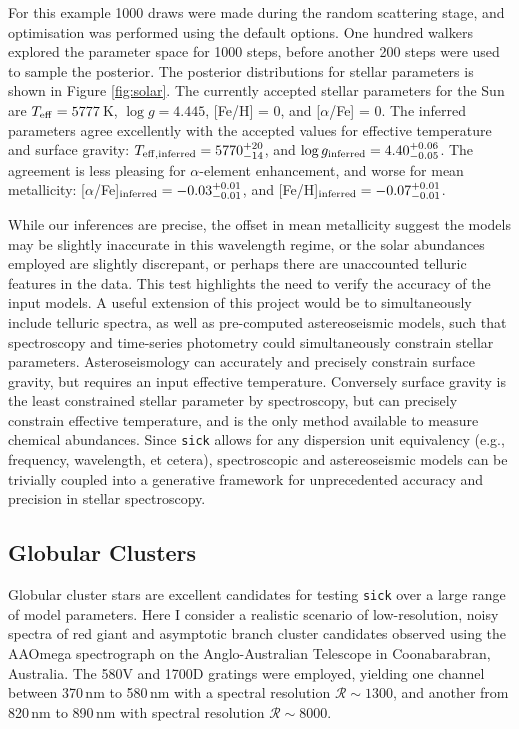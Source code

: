 \documentclass[iop]{emulateapj}
\newcommand{\sick}{\texttt{sick}}
\begin{document}
For this example 1000 draws were made during the random scattering stage, and 
optimisation was performed using the default options. One hundred walkers 
explored the parameter space for 1000 steps, before another 200 steps were used 
to sample the posterior. The posterior distributions for stellar parameters is 
shown in Figure \ref{fig:solar}. The currently accepted stellar parameters for 
the Sun are $T_{\rm eff} = 5777$\,K, $\log{g} = 4.445$, [Fe/H] = 0, and 
[$\alpha$/Fe] = 0. The inferred parameters agree excellently with the accepted 
values for effective temperature and surface gravity: 
$T_{{\rm eff},{\rm inferred}} = 5770^{+20}_{-14}$, and $\log{g}_{\rm inferred} = 4.40^{+0.06}_{-0.05}$. 
The agreement is less pleasing for $\alpha$-element enhancement, and worse for 
mean metallicity: [$\alpha$/Fe]$_{\rm inferred} = -0.03^{+0.01}_{-0.01}$, and 
[Fe/H]$_{\rm inferred} = -0.07^{+0.01}_{-0.01}$. 

While our inferences are precise, the offset in mean metallicity suggest the 
models may be slightly inaccurate in this wavelength regime, or the solar abundances
employed are slightly discrepant, or perhaps there are 
unaccounted telluric features in the data. This test highlights the need to 
verify the accuracy of the input models. A useful extension of this project 
would be to simultaneously include telluric spectra, as well as pre-computed 
astereoseismic models, such that spectroscopy and time-series photometry could 
simultaneously constrain stellar parameters. Asteroseismology can accurately and 
precisely constrain surface gravity, but requires an input effective temperature. 
Conversely surface gravity is the least constrained stellar parameter by spectroscopy, 
but can precisely constrain effective temperature, and is the only method available 
to measure chemical abundances. Since \sick{} allows for any dispersion unit 
equivalency (e.g., frequency, wavelength, et cetera), spectroscopic and astereoseismic 
models can be trivially coupled into a generative framework for unprecedented 
accuracy and precision in stellar spectroscopy.

\subsection{Globular Clusters}
Globular cluster stars are excellent candidates for testing \sick{} over a large 
range of model parameters. Here I consider a realistic scenario of 
low-resolution, noisy spectra of red giant and asymptotic branch cluster 
candidates observed using the AAOmega spectrograph on the Anglo-Australian 
Telescope in Coonabarabran, Australia. The 580V and 1700D gratings were employed, 
yielding one channel between 370\,nm to 580\,nm with a spectral resolution 
$\mathcal{R} \sim 1300$, and another from 820\,nm to 890\,nm with spectral 
resolution $\mathcal{R} \sim 8000$.
\end{document}
